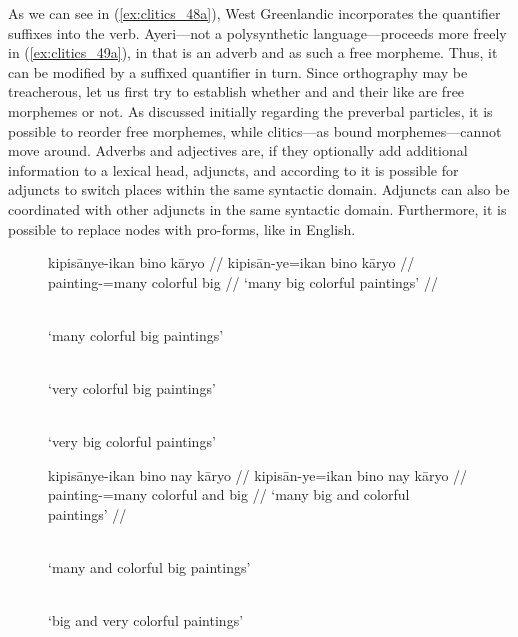 As we can see in (\ref{ex:clitics_48a}), West Greenlandic incorporates the
quantifier suffixes into the verb. Ayeri---not a polysynthetic
language---proceeds more freely in (\ref{ex:clitics_49a}), in that
 is an adverb and as such a free
morpheme. Thus, it can be modified by a suffixed quantifier in turn. Since
orthography may be treacherous, let us first try to establish whether
 and  and their
like are free morphemes or not. As discussed initially regarding the preverbal
particles, it is possible to reorder free morphemes, while clitics---as bound
morphemes---cannot move around. Adverbs and adjectives are, if they optionally
add additional information to a lexical head, adjuncts, and according to
\citet{carnie2013} it is possible for adjuncts to switch places within the same
syntactic domain. Adjuncts can also be coordinated with other adjuncts in the
same syntactic domain. Furthermore, it is possible to replace  nodes
with pro-forms, like  in English.

\begin{figure}
\pex\label{ex:clitics_50}
\a\label{ex:clitics_50a}\begingl
	\gla kipisānye-ikan bino kāryo //
	\glb kipisān-ye=ikan bino kāryo //
	\glc painting-\Pl{}=many colorful big //
	\glft `many big colorful paintings' //
\endgl

\a\label{ex:clitics_50b}  \\
	`many colorful big paintings'

\a\label{ex:clitics_50c} \ljudge{\excl}  \\
	\hphantom{\excl}`very colorful big paintings'

\a\label{ex:clitics_50d} \ljudge{\excl}  \\
	\hphantom{\excl}`very big colorful paintings'
\xe
\end{figure}

\begin{figure}
\pex\label{ex:clitics_51}
\a\label{ex:clitics_51a}\begingl
	\gla kipisānye-ikan bino nay kāryo //
	\glb kipisān-ye=ikan bino nay kāryo //
	\glc painting-\Pl{}=many colorful and big //
	\glft `many big and colorful paintings' //
\endgl

\a\label{ex:clitics_51b} \ljudge{*}  \\
	\hphantom{*}`many and colorful big paintings'

\a\label{ex:clitics_51c} \ljudge{\excl}  \\
	\hphantom{\excl}`big and very colorful paintings'
\xe
\end{figure}

